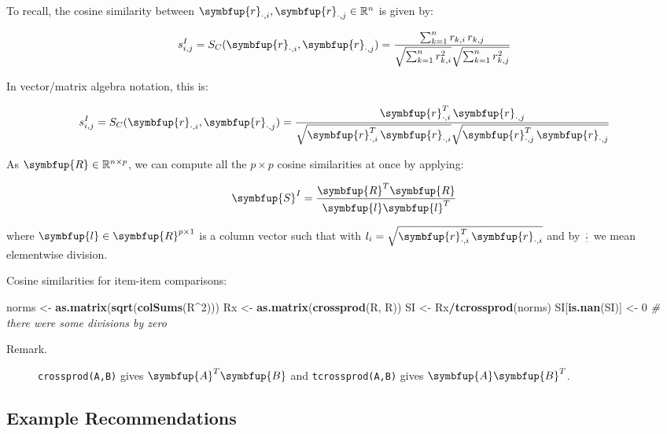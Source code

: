 \documentclass[10pt,b5paper,krantz1]{krantz}
\newenvironment{Shaded}{\begin{snugshade}}{\end{snugshade}}
\newcommand{\CommentTok}[1]{\textcolor[rgb]{0.37,0.37,0.37}{\textit{#1}}}
\newcommand{\DecValTok}[1]{\textcolor[rgb]{0.06,0.06,0.06}{#1}}
\newcommand{\KeywordTok}[1]{\textcolor[rgb]{0.27,0.27,0.27}{\textbf{#1}}}
\newcommand{\NormalTok}[1]{#1}
\newcommand{\OperatorTok}[1]{\textcolor[rgb]{0.43,0.43,0.43}{\textbf{#1}}}
\newcommand{\StringTok}[1]{\textcolor[rgb]{0.5,0.5,0.5}{#1}}
\renewcommand{\mathbf}[1]{\symbfup{#1}}
\begin{document}
To recall, the cosine similarity between
\(\mathbf{r}_{\cdot,i},\mathbf{r}_{\cdot,j}\in\mathbb{R}^n\)
is given by:

\[
s_{i,j}^I = S_C(\mathbf{r}_{\cdot,i},\mathbf{r}_{\cdot,j}) = \frac{\sum_{k=1}^n r_{k,i} \, r_{k,j}}{
    \sqrt{\sum_{k=1}^n r_{k,i}^2}\sqrt{\sum_{k=1}^n r_{k,j}^2}
}
\]

In vector/matrix algebra notation, this is:

\[
s_{i,j}^I = S_C(\mathbf{r}_{\cdot,i},\mathbf{r}_{\cdot,j}) = \frac{\mathbf{r}_{\cdot,i}^T\, \mathbf{r}_{\cdot,j}}{
\sqrt{{\mathbf{r}_{\cdot,i}^T\, \mathbf{r}_{\cdot,i}}} \sqrt{{\mathbf{r}_{\cdot,j}^T\, \mathbf{r}_{\cdot,j}}}
}
\]

As \(\mathbf{R}\in\mathbb{R}^{n\times p}\),
we can compute all the \(p\times p\) cosine similarities
at once by applying:

\[
\mathbf{S}^I = \frac{\mathbf{R}^T \mathbf{R}}{
\mathbf{l} \mathbf{l}^T
}
\]

where \(\mathbf{l}\in\mathbf{R}^{p\times 1}\) is a column vector
such that with
\(l_i = \sqrt{{\mathbf{r}_{\cdot,i}^T\, \mathbf{r}_{\cdot,i}}}\)
and by \(\frac{\cdot}{\cdot}\) we mean elementwise division.

Cosine similarities for item-item comparisons:

\begin{Shaded}
\begin{Highlighting}[]
\NormalTok{norms <-}\StringTok{ }\KeywordTok{as.matrix}\NormalTok{(}\KeywordTok{sqrt}\NormalTok{(}\KeywordTok{colSums}\NormalTok{(R}\OperatorTok{^}\DecValTok{2}\NormalTok{)))}
\NormalTok{Rx <-}\StringTok{ }\KeywordTok{as.matrix}\NormalTok{(}\KeywordTok{crossprod}\NormalTok{(R, R))}
\NormalTok{SI <-}\StringTok{ }\NormalTok{Rx}\OperatorTok{/}\KeywordTok{tcrossprod}\NormalTok{(norms)}
\NormalTok{SI[}\KeywordTok{is.nan}\NormalTok{(SI)] <-}\StringTok{ }\DecValTok{0} \CommentTok{# there were some divisions by zero}
\end{Highlighting}
\end{Shaded}

\begin{description}
\item[Remark.]
\texttt{crossprod(A,B)} gives \(\mathbf{A}^T \mathbf{B}\)
and \texttt{tcrossprod(A,B)} gives \(\mathbf{A} \mathbf{B}^T\).
\end{description}

\hypertarget{example-recommendations}{%
\subsection{Example Recommendations}\label{example-recommendations}}
\end{document}

